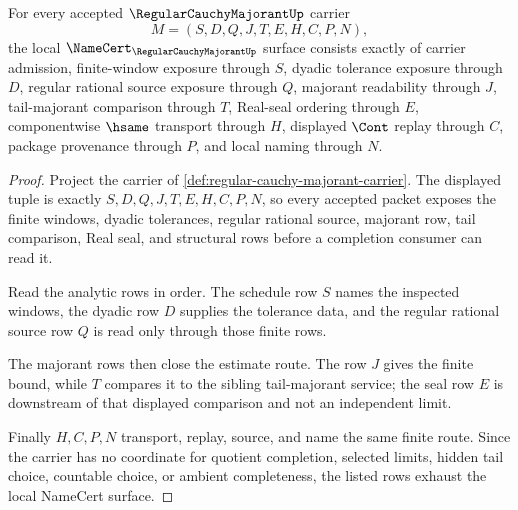 \begin{theorem}
\label{thm:regular-cauchy-majorant-namecert-obligations}
For every accepted $\RegularCauchyMajorantUp$ carrier
$$
M=(S,D,Q,J,T,E,H,C,P,N),
$$
the local $\NameCert_{\RegularCauchyMajorantUp}$ surface consists exactly of carrier admission, finite-window exposure through $S$, dyadic tolerance exposure through $D$, regular rational source exposure through $Q$, majorant readability through $J$, tail-majorant comparison through $T$, Real-seal ordering through $E$, componentwise $\hsame$ transport through $H$, displayed $\Cont$ replay through $C$, package provenance through $P$, and local naming through $N$.
\end{theorem}
\begin{proof}
Project the carrier of \autoref{def:regular-cauchy-majorant-carrier}. The displayed tuple is exactly $S,D,Q,J,T,E,H,C,P,N$, so every accepted packet exposes the finite windows, dyadic tolerances, regular rational source, majorant row, tail comparison, Real seal, and structural rows before a completion consumer can read it.

Read the analytic rows in order. The schedule row $S$ names the inspected windows, the dyadic row $D$ supplies the tolerance data, and the regular rational source row $Q$ is read only through those finite rows.

The majorant rows then close the estimate route. The row $J$ gives the finite bound, while $T$ compares it to the sibling tail-majorant service; the seal row $E$ is downstream of that displayed comparison and not an independent limit.

Finally $H,C,P,N$ transport, replay, source, and name the same finite route. Since the carrier has no coordinate for quotient completion, selected limits, hidden tail choice, countable choice, or ambient completeness, the listed rows exhaust the local NameCert surface.
\end{proof}

